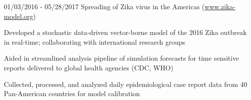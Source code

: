 \begin{cventries}
{\begin{cvitems}
      \end{cvitems}
    }
  \cventry
    {} %
    {} %
    {} %
    {01/03/2016 - 05/28/2017} %
    {Spreading of Zika virus in the Americas	(\href{www.zika-model.org}{www.zika-model.org})}
    {
      \begin{cvitems} %
      	\item {Developed a stochastic data-driven vector-borne model of the 2016 Zika outbreak in real-time; 
        collaborating with 
        international
        research groups}   
        \item {Aided in streamlined analysis pipeline of 
        simulation forecasts
        for time sensitive reports delivered to global health agencies (CDC, WHO)}
        \item {Collected, processed, and analyzed daily epidemiological case report data from 40 Pan-American countries for model calibration}
      \end{cvitems}
    }

\end{cventries}
